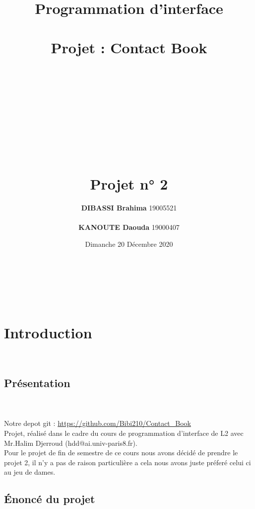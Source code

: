 \documentclass[a4paper, 11pt]{article}
\begin{document}
\title{{\Huge\bf{ Programmation d'interface \\~\\  Projet : Contact Book}} \\~ \Large \\~\\
\hline \\
\\~\\~\\  Projet n° 2 }
\author{
{\bf DIBASSI Brahima} 19005521 \\\\  
{\bf KANOUTE Daouda} 19000407}  \\
\date {Dimanche 20 Décembre 2020} 

\maketitle
\\
\tableofcontents

\newpage
\section{Introduction} \\

\subsection{Présentation} \\~\\
Notre depot git : \url{https://github.com/Bibi210/Contact\_Book}\\
\hspace{-1.5em}Projet, réalisé dans le cadre du cours de programmation d'interface de L2 avec Mr.Halim Djerroud (hdd@ai.univ-paris8.fr).\\

Pour le projet de fin de semestre de ce cours nous avons décidé de prendre le projet 2, il n'y a pas de raison particulière a cela nous avons juste préferé celui ci au jeu de dames.\\

\subsection{Énoncé du projet}
\end{document}
